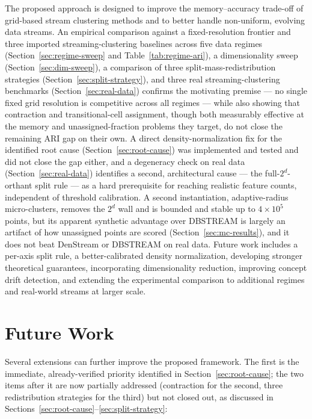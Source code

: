 \documentclass[11pt]{article}
\begin{document}
The proposed approach is designed to improve the memory--accuracy trade-off of grid-based stream clustering methods and to better handle non-uniform, evolving data streams. An empirical comparison against a fixed-resolution frontier and three imported streaming-clustering baselines across five data regimes (Section~\ref{sec:regime-sweep} and Table~\ref{tab:regime-ari}), a dimensionality sweep (Section~\ref{sec:dim-sweep}), a comparison of three split-mass-redistribution strategies (Section~\ref{sec:split-strategy}), and three real streaming-clustering benchmarks (Section~\ref{sec:real-data}) confirms the motivating premise — no single fixed grid resolution is competitive across all regimes — while also showing that contraction and transitional-cell assignment, though both measurably effective at the memory and unassigned-fraction problems they target, do not close the remaining ARI gap on their own. A direct density-normalization fix for the identified root cause (Section~\ref{sec:root-cause}) was implemented and tested and did not close the gap either, and a degeneracy check on real data (Section~\ref{sec:real-data}) identifies a second, architectural cause — the full-$2^d$-orthant split rule — as a hard prerequisite for reaching realistic feature counts, independent of threshold calibration. A second instantiation, adaptive-radius micro-clusters, removes the $2^d$ wall and is bounded and stable up to $4\times10^5$ points, but its apparent synthetic advantage over DBSTREAM is largely an artifact of how unassigned points are scored (Section~\ref{sec:mc-results}), and it does not beat DenStream or DBSTREAM on real data. Future work includes a per-axis split rule, a better-calibrated density normalization, developing stronger theoretical guarantees, incorporating dimensionality reduction, improving concept drift detection, and extending the experimental comparison to additional regimes and real-world streams at larger scale.

\section*{Future Work}

Several extensions can further improve the proposed framework. The first is the immediate, already-verified priority identified in Section~\ref{sec:root-cause}; the two items after it are now partially addressed (contraction for the second, three redistribution strategies for the third) but not closed out, as discussed in Sections~\ref{sec:root-cause}--\ref{sec:split-strategy}:
\end{document}
